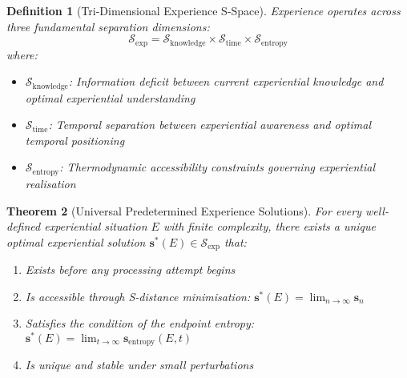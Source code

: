 \documentclass{article}
\newtheorem{theorem}{Theorem}[section]
\newtheorem{definition}[theorem]{Definition}
\begin{document}
\begin{definition}[Tri-Dimensional Experience S-Space]
Experience operates across three fundamental separation dimensions:
\begin{equation}
\mathcal{S}_{\text{exp}} = \mathcal{S}_{\text{knowledge}} \times \mathcal{S}_{\text{time}} \times \mathcal{S}_{\text{entropy}}
\end{equation}
where:
\begin{itemize}
\item $\mathcal{S}_{\text{knowledge}}$: Information deficit between current experiential knowledge and optimal experiential understanding
\item $\mathcal{S}_{\text{time}}$: Temporal separation between experiential awareness and optimal temporal positioning
\item $\mathcal{S}_{\text{entropy}}$: Thermodynamic accessibility constraints governing experiential realisation
\end{itemize}
\end{definition}

\begin{theorem}[Universal Predetermined Experience Solutions]
\label{thm:predetermined_experience_solutions}
For every well-defined experiential situation $E$ with finite complexity, there exists a unique optimal experiential solution $\mathbf{s}^*(E) \in \mathcal{S}_{\text{exp}}$ that:
\begin{enumerate}
\item Exists before any processing attempt begins
\item Is accessible through S-distance minimisation: $\mathbf{s}^*(E) = \lim_{n \to \infty} \mathbf{s}_n$
\item Satisfies the condition of the endpoint entropy: $\mathbf{s}^*(E) = \lim_{t \to \infty} \mathbf{s}_{\text{entropy}}(E, t)$
\item Is unique and stable under small perturbations
\end{enumerate}
\end{theorem}
\end{document}
